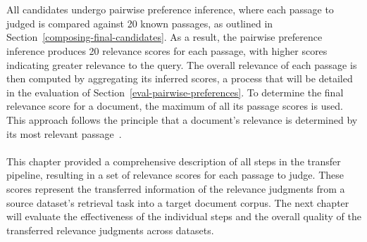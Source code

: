 \\\\
All candidates undergo pairwise preference inference, where each passage to judged is compared against 20 known passages, as outlined in Section~\ref{composing-final-candidates}. As a result, the pairwise preference inference produces 20 relevance scores for each passage, with higher scores indicating greater relevance to the query. The overall relevance of each passage is then computed by aggregating its inferred scores, a process that will be detailed in the evaluation of Section~\ref{eval-pairwise-preferences}. To determine the final relevance score for a document, the maximum of all its passage scores is used. This approach follows the principle that a document's relevance is determined by its most relevant passage~\cite{craswell:2019}.
\\\\
This chapter provided a comprehensive description of all steps in the transfer pipeline, resulting in a set of relevance scores for each passage to judge. These scores represent the transferred information of the relevance judgments from a source dataset's retrieval task into a target document corpus. The next chapter will evaluate the effectiveness of the individual steps and the overall quality of the transferred relevance judgments across datasets.